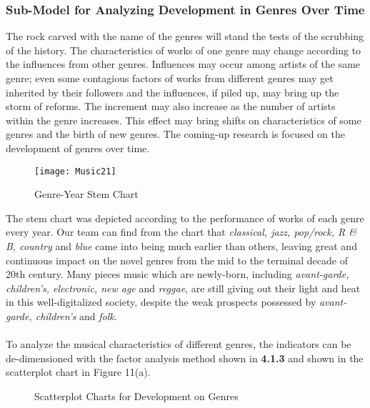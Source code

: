 \documentclass[12pt]{article}
\begin{document}
{\subsubsection{Sub-Model for Analyzing Development in Genres Over Time}
The rock carved with the name of the genres will stand the tests of the scrubbing of the history. The characteristics of works of one genre may change according to the influences from other genres. Influences may occur among artists of the same genre; even some contagious factors of works from different genres may get inherited by their followers and the influences, if piled up, may bring up the storm of reforms. The increment may also increase as the number of artists within the genre increases. This effect may bring shifts on characteristics of some genres and the birth of new genres. The coming-up research is focused on the development of genres over time.\\
\begin{wrapfigure}{l}{0cm}
	\texttt{[image: Music21]}
	\caption{Genre-Year Stem Chart}
\end{wrapfigure}
The stem chart was depicted according to the performance of works of each genre every year. Our team can find from the chart that \textit{classical, jazz, pop/rock, R \& B, country} and \textit{blue} came into being much earlier than others, leaving great and continuous impact on the novel genres from the mid to the terminal decade of 20th century. Many pieces music which are newly-born, including \textit{avant-garde, children's, electronic, new age} and \textit{reggae}, are still giving out their light and heat in this well-digitalized society, despite the weak prospects possessed by \textit{avant-garde, children's} and \textit{folk}.\\[2ex]\\
To analyze the musical characteristics of different genres, the indicators can be de-dimensioned with the factor analysis method shown in \textbf{4.1.3} and shown in the scatterplot chart in Figure 11(a).
\begin{figure}[h]
	\begin{subfigure}[Year-Characteristics Scatterplot Chart]
		{\texttt{[image: Music22]}}
	\end{subfigure}
	\begin{subfigure}[Year-Preferences Scatterplot Chart]
		{\texttt{[image: Music23]}}
	\end{subfigure}
	\caption{Scatterplot Charts for Development on Genres}
\end{figure}\\[5ex]
}
\end{document}
